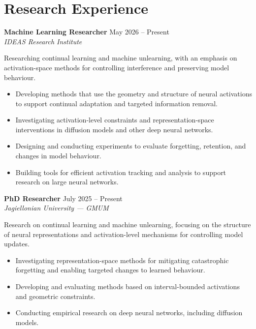 \documentclass[11pt,a4paper]{article}
\begin{document}
\section*{Research Experience}
\noindent\textbf{Machine Learning Researcher} \hfill {\small\color{graytext} May 2026 -- Present}\\
\textit{IDEAS Research Institute}\par
\vspace{1pt}\noindent Researching continual learning and machine unlearning, with an emphasis on activation-space methods for controlling interference and preserving model behaviour.\par\vspace{1pt}
\begin{itemize}[leftmargin=1.2em,topsep=0.5pt,itemsep=0.3pt,parsep=0pt]
  \item Developing methods that use the geometry and structure of neural activations to support continual adaptation and targeted information removal.
  \item Investigating activation-level constraints and representation-space interventions in diffusion models and other deep neural networks.
  \item Designing and conducting experiments to evaluate forgetting, retention, and changes in model behaviour.
  \item Building tools for efficient activation tracking and analysis to support research on large neural networks.
\end{itemize}
\vspace{0.5pt}
\noindent\textbf{PhD Researcher} \hfill {\small\color{graytext} July 2025 -- Present}\\
\textit{Jagiellonian University --- GMUM}\par
\vspace{1pt}\noindent Research on continual learning and machine unlearning, focusing on the structure of neural representations and activation-level mechanisms for controlling model updates.\par\vspace{1pt}
\begin{itemize}[leftmargin=1.2em,topsep=0.5pt,itemsep=0.3pt,parsep=0pt]
  \item Investigating representation-space methods for mitigating catastrophic forgetting and enabling targeted changes to learned behaviour.
  \item Developing and evaluating methods based on interval-bounded activations and geometric constraints.
  \item Conducting empirical research on deep neural networks, including diffusion models.
\end{itemize}
\end{document}
